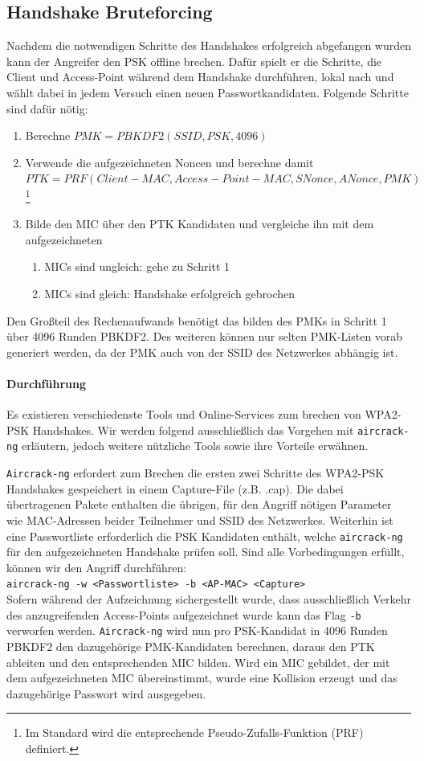 \subsection{Handshake Bruteforcing}\label{subs:cracking}
Nachdem die notwendigen Schritte des Handshakes erfolgreich abgefangen wurden kann der Angreifer den PSK offline brechen.
Dafür spielt er die Schritte, die Client und Access-Point während dem Handshake durchführen, lokal nach und wählt dabei in jedem Versuch einen neuen Passwortkandidaten.
Folgende Schritte sind dafür nötig:
\begin{enumerate}
	\item Berechne $PMK = PBKDF2(SSID, PSK, 4096)$
	\item Verwende die aufgezeichneten Noncen und berechne damit \\$PTK = PRF(Client-MAC, Access-Point-MAC, SNonce, ANonce, PMK)$\footnote{Im Standard wird die entsprechende Pseudo-Zufalls-Funktion (PRF) definiert.}
	\item Bilde den MIC über den PTK Kandidaten und vergleiche ihn mit dem aufgezeichneten
	\begin{enumerate}
		\item MICs sind ungleich: gehe zu Schritt 1
		\item MICs sind gleich: Handshake erfolgreich gebrochen
	\end{enumerate}
\end{enumerate}
Den Großteil des Rechenaufwands benötigt das bilden des PMKs in Schritt 1 über 4096 Runden PBKDF2.
Des weiteren können nur selten PMK-Listen vorab generiert werden, da der PMK auch von der SSID des Netzwerkes abhängig ist.

\paragraph{Durchführung}
Es existieren verschiedenste Tools und Online-Services zum brechen von WPA2-PSK Handshakes.
Wir werden folgend ausschließlich das Vorgehen mit \texttt{aircrack-ng} erläutern, jedoch weitere nützliche Tools sowie ihre Vorteile erwähnen.

\texttt{Aircrack-ng} erfordert zum Brechen die ersten zwei Schritte des WPA2-PSK Handshakes gespeichert in einem Capture-File (z.B. .cap).
Die dabei übertragenen Pakete enthalten die übrigen, für den Angriff nötigen Parameter wie MAC-Adressen beider Teilnehmer und SSID des Netzwerkes.
Weiterhin ist eine Passwortliste erforderlich die PSK Kandidaten enthält, welche \texttt{aircrack-ng} für den aufgezeichneten Handshake prüfen soll.
Sind alle Vorbedingungen erfüllt, können wir den Angriff durchführen:
\\\texttt{aircrack-ng -w <Passwortliste> -b <AP-MAC> <Capture>}\\
Sofern während der Aufzeichnung sichergestellt wurde, dass ausschließlich Verkehr des anzugreifenden Access-Points aufgezeichnet wurde kann das Flag \texttt{-b} verworfen werden.
\texttt{Aircrack-ng} wird nun pro PSK-Kandidat in 4096 Runden PBKDF2 den dazugehörige PMK-Kandidaten berechnen, daraus den PTK ableiten und den entsprechenden MIC bilden.
Wird ein MIC gebildet, der mit dem aufgezeichneten MIC übereinstimmt, wurde eine Kollision erzeugt und das dazugehörige Passwort wird ausgegeben.

